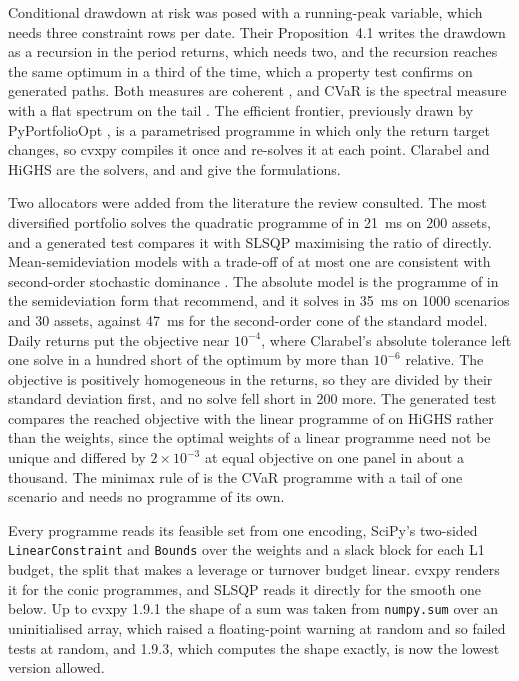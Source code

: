 Conditional drawdown at risk \citep{chekhlov_drawdown_2005} was posed with a
running-peak variable, which needs three constraint rows per date. Their
Proposition~4.1 writes the drawdown as a recursion in the period returns,
which needs two, and the recursion reaches the same optimum in a third of the
time, which a property test confirms on generated paths. Both measures are
coherent
\citep{artzner_coherent_1999,acerbi_coherence_2002}, and CVaR is the spectral
measure with a flat spectrum on the tail
\citep{acerbi_spectral_2002,wang_class_2000}.
The efficient frontier, previously drawn by PyPortfolioOpt
\citep{markowitz_portfolio_1952}, is a parametrised programme in which only
the return target changes, so cvxpy compiles it once and re-solves it at each
point. Clarabel \citep{goulart_clarabel_2026} and HiGHS
\citep{huangfu_parallelizing_2018} are the solvers, and
\citet{boyd_convex_2004} and \citet{cornuejols_optimization_2007} give the
formulations.

Two allocators were added from the literature the review consulted. The most
diversified portfolio \citep{choueifaty_toward_2008} solves the quadratic
programme of \citet{choueifaty_properties_2013} in 21~ms on 200 assets, and a
generated test compares it with SLSQP maximising the ratio of
\citet{choueifaty_toward_2008} directly. Mean-semideviation models with a
trade-off of at most one are consistent with second-order stochastic dominance
\citep{ogryczak_stochastic_1999}. The absolute model is the programme of
\citet{konno_meanabsolute_1991} in the semideviation form that
\citet{mansini_lp_2003} recommend, and it solves in 35~ms on 1000 scenarios
and 30 assets, against 47~ms for the second-order cone of the standard
model. Daily returns put the objective near $10^{-4}$, where Clarabel's
absolute tolerance left one solve in a hundred short of the optimum by more
than $10^{-6}$ relative. The objective is positively homogeneous in the
returns, so they are divided by their standard deviation first, and no solve
fell short in 200 more. The generated test compares the reached objective with
the linear programme of \citet{mansini_lp_2003} on HiGHS rather than the
weights, since the optimal weights of a linear programme need not be unique
and differed by $2 \times 10^{-3}$ at equal objective on one panel in about a
thousand. The minimax rule of \citet{young_minimax_1998} is the CVaR programme
with a tail of one scenario and needs no programme of its own.

Every programme reads its feasible set from one encoding, SciPy's two-sided
\texttt{LinearConstraint} and \texttt{Bounds} over the weights and a slack
block for each L1 budget, the split that makes a leverage or turnover budget
linear. cvxpy renders it for the conic programmes, and SLSQP reads it directly
for the smooth one below. Up to cvxpy 1.9.1 the shape of a sum was taken
from \texttt{numpy.sum} over an uninitialised array, which raised a
floating-point warning at random and so failed tests at random, and 1.9.3,
which computes the shape exactly, is now the lowest version allowed.

